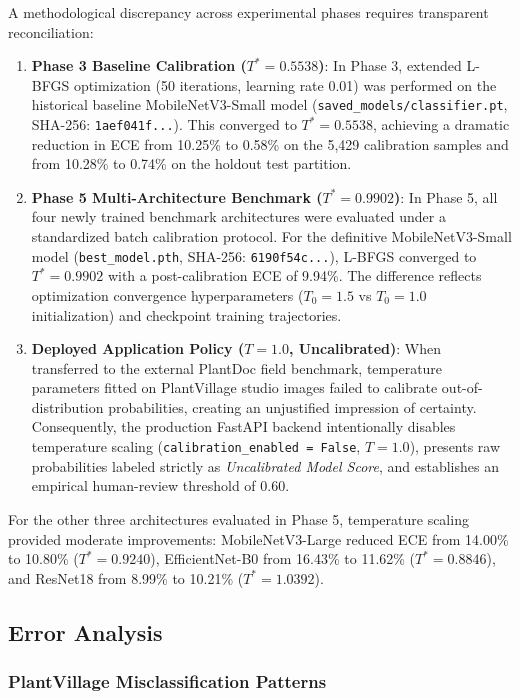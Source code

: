 \documentclass[pdflatex,sn-mathphys-num]{sn-jnl}
\theoremstyle{thmstyleone}%
\theoremstyle{thmstyletwo}%
\theoremstyle{thmstylethree}%
\begin{document}
A methodological discrepancy across experimental phases requires transparent reconciliation:
\begin{enumerate}
  \item \textbf{Phase 3 Baseline Calibration ($T^* = 0.5538$)}: In Phase 3, extended L-BFGS optimization (50 iterations, learning rate 0.01) was performed on the historical baseline MobileNetV3-Small model (\texttt{saved\_models/classifier.pt}, SHA-256: \texttt{1aef041f...}). This converged to $T^* = 0.5538$, achieving a dramatic reduction in ECE from 10.25\% to 0.58\% on the 5{,}429 calibration samples and from 10.28\% to 0.74\% on the holdout test partition.
  \item \textbf{Phase 5 Multi-Architecture Benchmark ($T^* = 0.9902$)}: In Phase 5, all four newly trained benchmark architectures were evaluated under a standardized batch calibration protocol. For the definitive MobileNetV3-Small model (\texttt{best\_model.pth}, SHA-256: \texttt{6190f54c...}), L-BFGS converged to $T^* = 0.9902$ with a post-calibration ECE of 9.94\%. The difference reflects optimization convergence hyperparameters ($T_0 = 1.5$ vs $T_0 = 1.0$ initialization) and checkpoint training trajectories.
  \item \textbf{Deployed Application Policy ($T = 1.0$, Uncalibrated)}: When transferred to the external PlantDoc field benchmark, temperature parameters fitted on PlantVillage studio images failed to calibrate out-of-distribution probabilities, creating an unjustified impression of certainty. Consequently, the production FastAPI backend intentionally disables temperature scaling (\texttt{calibration\_enabled = False}, $T=1.0$), presents raw probabilities labeled strictly as \textit{Uncalibrated Model Score}, and establishes an empirical human-review threshold of 0.60.
\end{enumerate}
For the other three architectures evaluated in Phase 5, temperature scaling provided moderate improvements: MobileNetV3-Large reduced ECE from 14.00\% to 10.80\% ($T^* = 0.9240$), EfficientNet-B0 from 16.43\% to 11.62\% ($T^* = 0.8846$), and ResNet18 from 8.99\% to 10.21\% ($T^* = 1.0392$).

\subsection{Error Analysis}
\label{sec:error_analysis}

\subsubsection{PlantVillage Misclassification Patterns}
\end{document}
